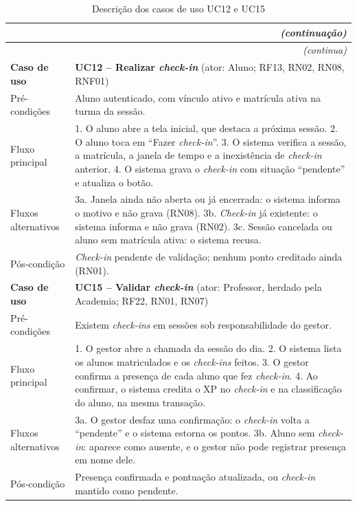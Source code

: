 \begin{quadrolongo}
\begin{longtable}{|p{2.7cm}|p{10.6cm}|}
  \caption{Descrição dos casos de uso UC12 e UC15}\label{qua:uc12-uc15}\\
\endfirsthead
  \multicolumn{2}{r}{\textit{(continuação)}}\\
  \hline
\endhead
  \multicolumn{2}{r}{\textit{(continua)}}\\
\endfoot
\endlastfoot
  \hline
    \textbf{Caso de uso} & \textbf{UC12 -- Realizar \textit{check-in}} (ator: Aluno; RF13, RN02, RN08, RNF01) \\ \hline
    Pré-condições & Aluno autenticado, com vínculo ativo e matrícula ativa na turma da sessão. \\ \hline
    Fluxo principal & 1. O aluno abre a tela inicial, que destaca a próxima sessão. 2. O aluno toca em ``Fazer \textit{check-in}''. 3. O sistema verifica a sessão, a matrícula, a janela de tempo e a inexistência de \textit{check-in} anterior. 4. O sistema grava o \textit{check-in} com situação ``pendente'' e atualiza o botão. \\ \hline
    Fluxos alternativos & 3a. Janela ainda não aberta ou já encerrada: o sistema informa o motivo e não grava (RN08). 3b. \textit{Check-in} já existente: o sistema informa e não grava (RN02). 3c. Sessão cancelada ou aluno sem matrícula ativa: o sistema recusa. \\ \hline
    Pós-condição & \textit{Check-in} pendente de validação; nenhum ponto creditado ainda (RN01). \\ \hline\hline
    \textbf{Caso de uso} & \textbf{UC15 -- Validar \textit{check-in}} (ator: Professor, herdado pela Academia; RF22, RN01, RN07) \\ \hline
    Pré-condições & Existem \textit{check-ins} em sessões sob responsabilidade do gestor. \\ \hline
    Fluxo principal & 1. O gestor abre a chamada da sessão do dia. 2. O sistema lista os alunos matriculados e os \textit{check-ins} feitos. 3. O gestor confirma a presença de cada aluno que fez \textit{check-in}. 4. Ao confirmar, o sistema credita o XP no \textit{check-in} e na classificação do aluno, na mesma transação. \\ \hline
    Fluxos alternativos & 3a. O gestor desfaz uma confirmação: o \textit{check-in} volta a ``pendente'' e o sistema estorna os pontos. 3b. Aluno sem \textit{check-in}: aparece como ausente, e o gestor não pode registrar presença em nome dele. \\ \hline
    Pós-condição & Presença confirmada e pontuação atualizada, ou \textit{check-in} mantido como pendente. \\ \hline
\end{longtable}
\end{quadrolongo}

